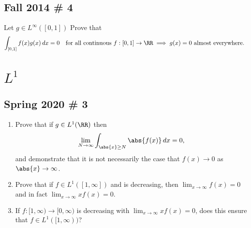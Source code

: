 \hypertarget{fall-2014-4}{%
\subsection{Fall 2014 \# 4}\label{fall-2014-4}}

Let \(g\in L^\infty([0, 1])\) Prove that
\begin{align*}
\int _{[0,1]} f(x) g(x)\, dx = 0 
\quad\text{for all continuous } f:[0, 1] \to \RR 
\implies g(x) = 0 \text{ almost everywhere. }
\end{align*}

\hypertarget{l1}{%
\section{\texorpdfstring{\(L^1\)}{L\^{}1}}\label{l1}}

\hypertarget{spring-2020-3}{%
\subsection{Spring 2020 \# 3}\label{spring-2020-3}}

\begin{enumerate}
\def\labelenumi{\alph{enumi}.}
\item
  Prove that if \(g\in L^1(\RR)\) then
  \begin{align*}
  \lim_{N\to \infty} \int _{\abs{x} \geq N} \abs{f(x)} \, dx = 0
  ,\end{align*} and demonstrate that it is not necessarily the case that
  \(f(x) \to 0\) as \(\abs{x}\to \infty\).
\item
  Prove that if \(f\in L^1([1, \infty])\) and is decreasing, then
  \(\lim_{x\to\infty}f(x) =0\) and in fact
  \(\lim_{x\to \infty} xf(x) = 0\).
\item
  If \(f: [1, \infty) \to [0, \infty)\) is decreasing with
  \(\lim_{x\to \infty} xf(x) = 0\), does this ensure that
  \(f\in L^1([1, \infty))\)?
\end{enumerate}

